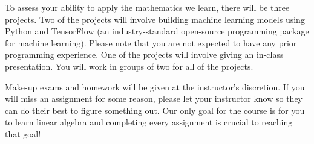 \documentclass[11pt]{article}
\begin{document}
\begin{description}[nosep]
    \item[Projects] To assess your ability to apply the mathematics we learn, there will be three projects. Two of the projects will involve building machine learning models using Python and TensorFlow (an industry-standard open-source programming package for machine learning). Please note that you are not expected to have any prior programming experience. One of the projects will involve giving an in-class presentation. You will work in groups of two for all of the projects. \vspace{.5em}

    \item[Make-up Work] Make-up exams and homework will be given at the instructor's discretion. If you will miss an assignment for some reason, please let your instructor know so they can do their best to figure something out. Our only goal for the course is for you to learn linear algebra and completing every assignment is crucial to reaching that goal!
\end{description}

\end{document}
